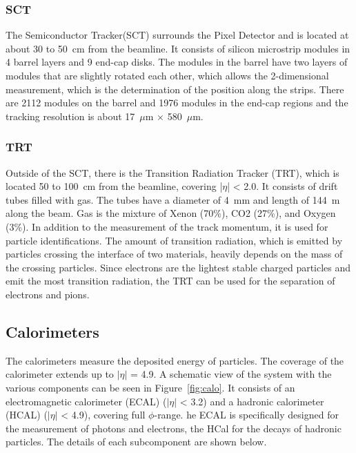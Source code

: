 \subsubsection{SCT}
The Semiconductor Tracker(SCT) surrounds the Pixel Detector and is located at about 30 to 50~cm from the beamline. 
It consists of silicon microstrip modules in 4 barrel layers and 9 end-cap disks.
The modules in the barrel have two layers of modules that are slightly rotated each other, which allows the 2-dimensional measurement, which is the determination of the position along the strips. There are 2112 modules on the barrel and 1976 modules in the end-cap regions and the tracking resolution is about 17~$\mu$m $\times$ 580~$\mu$m.

\subsubsection{TRT}
Outside of the SCT, there is the Transition Radiation Tracker (TRT), which is located 50 to 100~cm from the beamline, covering |$\eta$| < 2.0.
It consists of drift tubes filled with gas. The tubes have a diameter of 4~mm and length of 144~m along the beam. Gas is the  mixture of Xenon (70\%), CO2 (27\%), and Oxygen (3\%). 
In addition to the measurement of the track momentum, it is used for particle identifications. 
The amount of transition radiation, which is emitted by particles crossing the interface of two materials, heavily depends on the mass of the crossing particles. Since electrons are the lightest stable charged particles and emit the most transition radiation, the TRT can be used for the separation of electrons and pions.

\subsection{Calorimeters}
The calorimeters measure the deposited energy of particles. 
The coverage of the calorimeter extends up to $|\eta|$ = 4.9. A schematic view of the system with the various components can be seen in Figure~\ref{fig:calo}.
It consists of an electromagnetic calorimeter (ECAL) ($|\eta|$ < 3.2) and a hadronic calorimeter (HCAL)  ($|\eta|$ < 4.9), covering full $\phi$-range. he ECAL is specifically designed for the measurement of photons and electrons, the HCal for the decays of hadronic particles. The details of each subcomponent are shown below.

